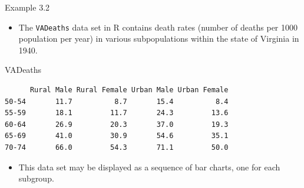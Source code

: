 \documentclass[
  9pt,
  a4paper,
  ignorenonframetext,
  notheorems]{beamer}
\newenvironment{Shaded}{\begin{snugshade}}{\end{snugshade}}
\newcommand{\NormalTok}[1]{\textcolor[rgb]{0.00,0.23,0.31}{#1}}
\providecommand{\tightlist}{%
  \setlength{\itemsep}{0pt}\setlength{\parskip}{0pt}}\usepackage{longtable,booktabs,array}
\begin{document}
\begin{frame}[fragile]
\begin{block}{Example 3.2}
\protect\hypertarget{example-3.2}{}
\begin{itemize}
\tightlist
\item
  The \texttt{VADeaths} data set in R contains death rates (number of
  deaths per 1000 population per year) in various subpopulations within
  the state of Virginia in 1940.
\end{itemize}

\begin{Shaded}
\begin{Highlighting}[]
\NormalTok{VADeaths}
\end{Highlighting}
\end{Shaded}

\begin{verbatim}
      Rural Male Rural Female Urban Male Urban Female
50-54       11.7          8.7       15.4          8.4
55-59       18.1         11.7       24.3         13.6
60-64       26.9         20.3       37.0         19.3
65-69       41.0         30.9       54.6         35.1
70-74       66.0         54.3       71.1         50.0
\end{verbatim}

\begin{itemize}
\tightlist
\item
  This data set may be displayed as a sequence of bar charts, one for
  each subgroup.
\end{itemize}
\end{block}
\end{frame}
\end{document}
